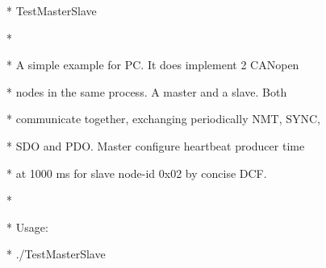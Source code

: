 \documentclass[a4paper,12pt]{book}
\newcommand{\canopen}{CANopen}
\begin{document}
{\ttfamily
* \space TestMasterSlave
\space \space \space \space \space \space \space \space \space \space \space \space \space \space \space \space \space \space \space \space \space \space \space \space \space \space \space \space \space \space \space \space \space \space \space \space \space \space \space \space \space \space *}

{\ttfamily
*
\space \space \space \space \space \space \space \space \space \space \space \space \space \space \space \space \space \space \space \space \space \space \space \space \space \space \space \space \space \space \space \space \space \space \space \space \space \space \space \space \space \space \space \space \space \space \space \space \space \space \space \space \space \space \space \space \space \space \space *}

{\ttfamily
* \space A simple example for PC. It does implement 2 \canopen{} \space \space \space \space \space *}

{\ttfamily
* \space nodes in the same process. A master and a slave. Both \space \space \space \space *}

{\ttfamily
* \space communicate together, exchanging periodically NMT, SYNC, \space *}

{\ttfamily
* \space SDO and PDO. Master configure heartbeat producer time \space \space \space \space *}

{\ttfamily
* \space at 1000 ms for slave node{}-id 0x02 by concise DCF.
\space \space \space \space \space \space \space \space *}

{\ttfamily
*
\space \space \space \space \space \space \space \space \space \space \space \space \space \space \space \space \space \space \space \space \space \space \space \space \space \space \space \space \space \space \space \space \space \space \space \space \space \space \space \space \space \space \space \space \space \space \space \space \space \space \space \space \space \space \space \space \space \space \space *}

{\ttfamily
* \space \space Usage:
\space \space \space \space \space \space \space \space \space \space \space \space \space \space \space \space \space \space \space \space \space \space \space \space \space \space \space \space \space \space \space \space \space \space \space \space \space \space \space \space \space \space \space \space \space \space \space \space \space \space *}

{\ttfamily
* \space \space ./TestMasterSlave \space [OPTIONS]
\space \space \space \space \space \space \space \space \space \space \space \space \space \space \space \space \space \space \space \space \space \space \space \space \space \space \space \space *}
\end{document}
